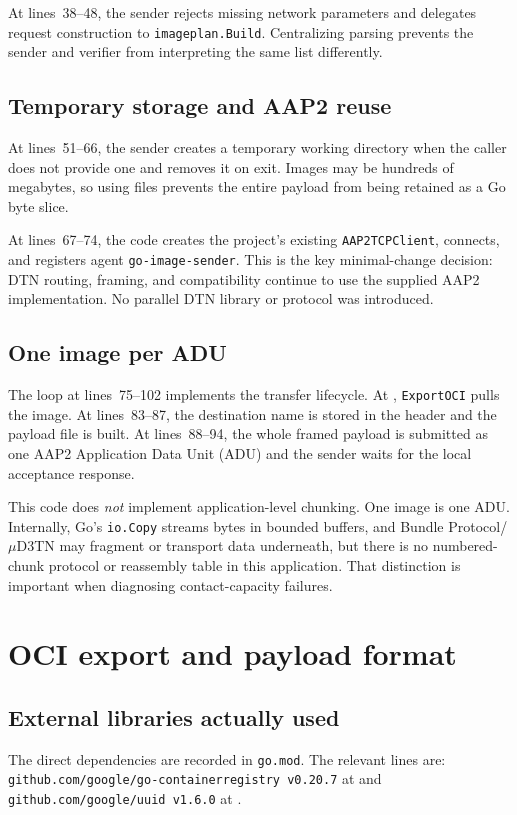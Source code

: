 \documentclass[11pt,a4paper]{article}
\newcommand{\file}[1]{\texttt{#1}}
\newcommand{\lines}[1]{lines~#1}
\begin{document}
At \lines{38--48}, the sender rejects missing network parameters and delegates
request construction to \file{imageplan.Build}. Centralizing parsing prevents
the sender and verifier from interpreting the same list differently.

\subsection{Temporary storage and AAP2 reuse}
At \lines{51--66}, the sender creates a temporary working directory when the
caller does not provide one and removes it on exit. Images may be hundreds of
megabytes, so using files prevents the entire payload from being retained as a
Go byte slice.

At \lines{67--74}, the code creates the project's existing
\file{AAP2TCPClient}, connects, and registers agent
\file{go-image-sender}. This is the key minimal-change decision: DTN routing,
framing, and compatibility continue to use the supplied AAP2 implementation.
No parallel DTN library or protocol was introduced.

\subsection{One image per ADU}
The loop at \lines{75--102} implements the transfer lifecycle. At ,
\file{ExportOCI} pulls the image. At \lines{83--87}, the destination name is
stored in the header and the payload file is built. At \lines{88--94}, the
whole framed payload is submitted as one AAP2 Application Data Unit (ADU) and
the sender waits for the local acceptance response.

This code does \emph{not} implement application-level chunking. One image is
one ADU. Internally, Go's \file{io.Copy} streams bytes in bounded buffers, and
Bundle Protocol/\(\mu\)D3TN may fragment or transport data underneath, but
there is no numbered-chunk protocol or reassembly table in this application.
That distinction is important when diagnosing contact-capacity failures.

\section{OCI export and payload format}
\subsection{External libraries actually used}
The direct dependencies are recorded in \file{go.mod}. The relevant lines are:
\file{github.com/google/go-containerregistry v0.20.7} at  and
\file{github.com/google/uuid v1.6.0} at .
\end{document}
